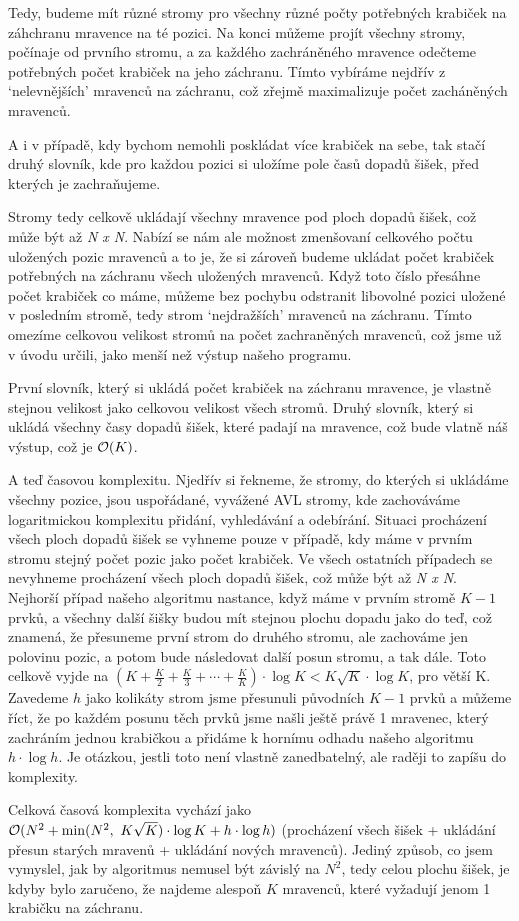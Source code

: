 \documentclass{../../../ksp}
\begin{document}
Tedy, budeme mít různé stromy pro všechny různé počty potřebných krabiček na záhchranu mravence na té pozici.
Na konci můžeme projít všechny stromy, počínaje od prvního stromu,
a za každého zachráněného mravence odečteme potřebných počet krabiček na jeho záchranu.
Tímto vybíráme nejdřív z `nelevnějších' mravenců na záchranu, což zřejmě maximalizuje počet zacháněných mravenců.

A i v případě, kdy bychom nemohli poskládat více krabiček na sebe, tak stačí druhý slovník, kde pro každou pozici si uložíme pole časů
dopadů šišek, před kterých je zachraňujeme.

Stromy tedy celkově ukládají všechny mravence pod ploch dopadů šišek, což může být až \emph{N x N}. Nabízí se nám ale možnost zmenšovaní
celkového počtu uložených pozic mravenců a to je, že si zároveň budeme ukládat počet krabiček potřebných na záchranu všech uložených mravenců.
Když toto číslo přesáhne počet krabiček co máme, můžeme bez pochybu odstranit libovolné pozici uložené v posledním stromě,
tedy strom `nejdražších' mravenců na záchranu. Tímto omezíme celkovou velikost stromů na počet zachraněných mravenců,
což jsme už v úvodu určili, jako menší než výstup našeho programu.

První slovník, který si ukládá počet krabiček na záchranu mravence, je vlastně stejnou velikost jako celkovou velikost všech stromů.
Druhý slovník, který si ukládá všechny časy dopadů šišek, které padají na mravence, což bude vlatně náš výstup, což je $\mathcal{O}(K)$.

A teď časovou komplexitu. Njedřív si řekneme, že stromy, do kterých si ukládáme všechny pozice, jsou uspořádané, vyvážené AVL stromy,
kde zachováváme logaritmickou komplexitu přidání, vyhledávání a odebírání. Situaci procházení všech ploch dopadů šišek se vyhneme
pouze v případě, kdy máme v prvním stromu stejný počet pozic jako počet krabiček. Ve všech ostatních případech se nevyhneme procházení
všech ploch dopadů šišek, což může být až \emph{N x N}. Nejhorší případ našeho algoritmu nastance, když máme v prvním stromě $K-1$ prvků,
a všechny další šišky budou mít stejnou plochu dopadu jako do teď, což znamená, že přesuneme první strom do druhého stromu,
ale zachováme jen polovinu pozic, a potom bude následovat další posun stromu, a tak dále.
Toto celkově vyjde na $(K + \frac{K}{2} + \frac{K}{3} + \cdots + \frac{K}{K}) \cdot \log{K} < K \sqrt{K} \cdot \log{K}$, pro větší K.
Zavedeme $h$ jako kolikáty strom jsme přesunuli původních $K-1$ prvků a můžeme říct, že po každém posunu těch prvků jsme našli ještě právě 1
mravenec, který zachráním jednou krabičkou a přidáme k hornímu odhadu našeho algoritmu $h \cdot \log{h}$.
Je otázkou, jestli toto není vlastně zanedbatelný, ale raději to zapíšu do komplexity.

Celková časová komplexita vychází jako $\mathcal{O}(N^{2} + \min (N^{2},\ K \sqrt{K}) \cdot \log{K} + h \cdot \log{h})$
(procházení všech šišek + ukládání přesun starých mravenů + ukládání nových mravenců). Jediný způsob, co jsem vymyslel,
jak by algoritmus nemusel být závislý na $N^2$, tedy celou plochu šišek, je kdyby bylo zaručeno, že najdeme alespoň $K$ mravenců,
které vyžadují jenom 1 krabičku na záchranu.
\end{document}
